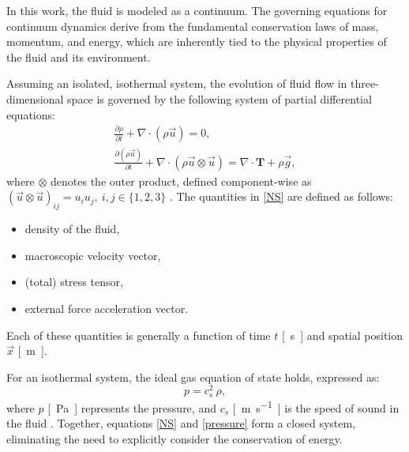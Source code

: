 In this work, the fluid is modeled as a continuum. The governing equations for continuum dynamics derive from the fundamental conservation laws of mass, momentum, and energy, which are inherently tied to the physical properties of the fluid and its environment.

Assuming an isolated, isothermal system, the evolution of fluid flow in three-dimensional space is governed by the following system of partial differential equations:
\begin{subequations}\label{NS}
	\begin{gather}
		\label{a}
		\frac{\partial \rho}{\partial t} + \nabla \cdot (\rho \vec{u}) = 0, \\[5pt]
		\label{b}
		\frac{\partial (\rho \vec{u})}{\partial t} + \nabla \cdot (\rho \vec{u} \otimes \vec{u}) = \nabla \cdot \mathbf{T} + \rho \vec{g},
	\end{gather}
\end{subequations}
where $ \otimes $ denotes the outer product, defined component-wise as $ (\vec{u} \otimes \vec{u})_{ij} = u_{i} u_{j}, \: i,j \in \{1,2,3\} $ \cite{Anderson}. The quantities in \eqref{NS} are defined as follows:
\begin{itemize}
	\item[]{\makebox[3cm]{$ \rho $ \si{[kg.m^{-3}]} \hfill} density of the fluid},
	\item[]{ macroscopic velocity vector,}
	\item[]{ (total) stress tensor,}
	\item[]{ external force acceleration vector.}
\end{itemize}
Each of these quantities is generally a function of time $ t $ \si{[s]} and spatial position $ \vec{x} $ \si{[m]}.

For an isothermal system, the ideal gas equation of state holds, expressed as:
\begin{equation}\label{pressure}
	p = c^{2}_{s} \ \rho,
\end{equation}
where $ p $ \si{[Pa]} represents the pressure, and $ c_{s} $ \si{[m.s^{-1}]} is the speed of sound in the fluid \cite{Latt}. Together, equations \eqref{NS} and \eqref{pressure} form a closed system, eliminating the need to explicitly consider the conservation of energy.